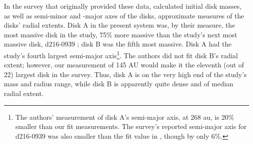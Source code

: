 In the survey that originally provided these data, \citet{Mann2014} calculated initial disk masses, as well as semi-minor and -major axes of the disks, approximate measures of the disks' radial extents. Disk A in the present system was, by their measure, the most massive disk in the study, 75\% more massive than the study's next most massive disk, d216-0939 \citet[which was the subject of][]{Factor2017} ; disk B was the fifth most massive. Disk A had the study's fourth largest semi-major axis\footnote{The authors' measurement of disk A's semi-major axis, at 268 au, is 20\% smaller than our fit measurements. The survey's reported semi-major axis for d216-0939 was also smaller than the fit value in \citet{Factor2017}, though by only 6\%.}. The authors did not fit disk B's radial extent; however, our measurement of 145 AU would make it the eleventh (out of 22) largest disk in the survey. Thus, disk A is on the very high end of the study's mass and radius range, while disk B is apparently quite dense and of median radial extent.


